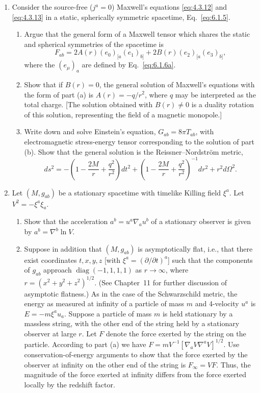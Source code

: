 \begin{enumerate}[label=\arabic*., leftmargin=*, itemsep=1.1em]
\item Consider the source-free (\(j^a=0\)) Maxwell's equations
  \eqref{eq:4.3.12} and \eqref{eq:4.3.13} in a static, spherically symmetric
  spacetime, Eq.~\eqref{eq:6.1.5}.
  \begin{enumerate}[label=\alph*), leftmargin=2.2em, itemsep=.45em]
  \item Argue that the general form of a Maxwell tensor which shares the static
    and spherical symmetries of the spacetime is
    \[
      F_{ab}=2A(r)(e_0)_{[a}(e_1)_{b]}
      +2B(r)(e_2)_{[a}(e_3)_{b]},
    \]
    where the \((e_\mu)_a\) are defined by Eq.~\eqref{eq:6.1.6a}.
  \item Show that if \(B(r)=0\), the general solution of Maxwell's equations with
    the form of part (a) is \(A(r)=-q/r^2\), where \(q\) may be interpreted as the
    total charge. [The solution obtained with \(B(r)\ne0\) is a duality rotation
    of this solution, representing the field of a magnetic monopole.]
  \item Write down and solve Einstein's equation, \(G_{ab}=8\pi T_{ab}\), with
    electromagnetic stress-energy tensor corresponding to the solution of part
    (b). Show that the general solution is the Reissner--Nordstr\"om metric,
    \[
      ds^2=-\left(1-\frac{2M}{r}+\frac{q^2}{r^2}\right)dt^2+
      \left(1-\frac{2M}{r}+\frac{q^2}{r^2}\right)^{-1}dr^2+r^2d\Omega^2.
    \]
  \end{enumerate}

\item Let \((M,g_{ab})\) be a stationary spacetime with timelike Killing field
  \(\xi^a\). Let \(V^2=-\xi^a\xi_a\).
  \begin{enumerate}[label=\alph*), leftmargin=2.2em, itemsep=.45em]
  \item Show that the acceleration
    \(a^b=u^a\nabla_a u^b\) of a stationary observer is given by
    \(a^b=\nabla^b\ln V\).
  \item Suppose in addition that \((M,g_{ab})\) is asymptotically flat, i.e., that
    there exist coordinates \(t,x,y,z\) [with \(\xi^a=(\partial/\partial t)^a\)]
    such that the components of \(g_{ab}\) approach
    \(\operatorname{diag}(-1,1,1,1)\) as \(r\to\infty\), where
    \(r=(x^2+y^2+z^2)^{1/2}\). (See Chapter~11 for further discussion of
    asymptotic flatness.) As in the case of the Schwarzschild metric, the energy
    as measured at infinity of a particle of mass \(m\) and 4-velocity \(u^a\)
    is \(E=-m\xi^au_a\). Suppose a particle of mass \(m\) is held stationary by a
    massless string, with the other end of the string held by a stationary observer
    at large \(r\). Let \(F\) denote the force exerted by the string on the
    particle. According to part (a) we have
    \(F=mV^{-1}[\nabla_aV\nabla^aV]^{1/2}\). Use conservation-of-energy
    arguments to show that the force exerted by the observer at infinity on the
    other end of the string is \(F_\infty=VF\). Thus, the magnitude of the force
    exerted at infinity differs from the force exerted locally by the redshift
    factor.
  \end{enumerate}


\end{enumerate}
